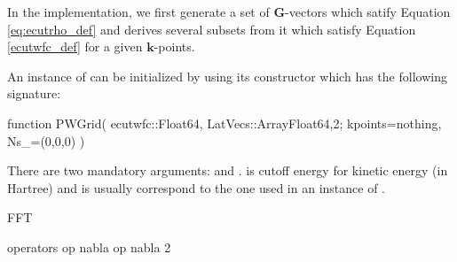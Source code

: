 In the implementation, we first generate a set of $\mathbf{G}$-vectors which satify
Equation \eqref{eq:ecutrho_def} and derives several subsets from it which
satisfy Equation \eqref{ecutwfc_def} for a given $\mathbf{k}$-points.

An instance of  can be initialized by using its constructor
which has the following signature:
\begin{juliacode}
function PWGrid( ecutwfc::Float64, LatVecs::Array{Float64,2};
    kpoints=nothing, Ns_=(0,0,0) )
\end{juliacode}
There are two mandatory arguments:  and .
 is cutoff energy for kinetic energy (in Hartree) and
 is usually correspond to the one used in an
instance of .

FFT


operators op nabla op nabla 2
